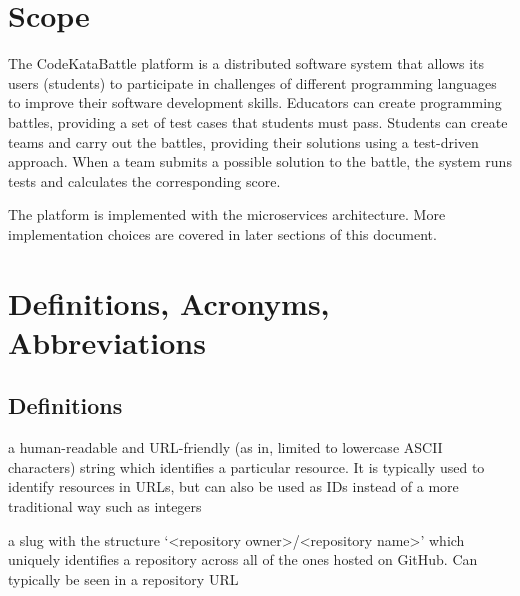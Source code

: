 \section{Scope}
The CodeKataBattle platform is a distributed software system that allows its users (students) to participate in challenges of different programming languages to improve their software development skills.
Educators can create programming battles, providing a set of test cases that students must pass.
Students can create teams and carry out the battles, providing their solutions using a test-driven approach.
When a team submits a possible solution to the battle, the system runs tests and calculates the corresponding score.

The platform is implemented with the microservices architecture. 
More implementation choices are covered in later sections of this document.

\section{Definitions, Acronyms, Abbreviations}

\subsection{Definitions}
\begin{description}[leftmargin=0pt]
    \item[Slug:] a human-readable and URL-friendly (as in, limited to lowercase ASCII characters) string which
          identifies a particular resource. It is typically used to identify resources in URLs, but can also be used
          as IDs instead of a more traditional way such as integers
    \item[GitHub Repository Slug:] a slug with the structure `<repository owner>/<repository name>' which uniquely
          identifies a repository across all of the ones hosted on GitHub. Can typically be seen in a repository URL
\end{description}

